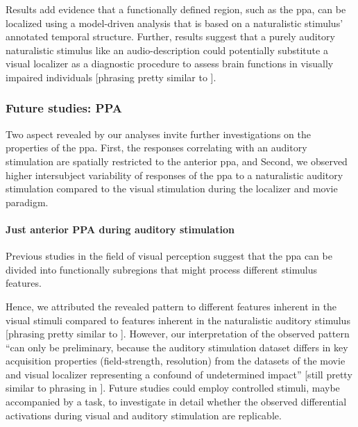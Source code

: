 
Results add evidence \citep[cf.][]{bartels2004mapping} that a functionally
defined region, such as the \ac{ppa}, can be localized using a model-driven
analysis that is based on a naturalistic stimulus' annotated temporal structure.
Further, results suggest that a purely auditory naturalistic stimulus like an
audio-description could potentially substitute a visual localizer as a
diagnostic procedure to assess brain functions in visually impaired individuals
[phrasing pretty similar to \citep{haeusler2022processing}].


\subsubsection{Future studies: PPA}

%
Two aspect revealed by our analyses invite further investigations on the
properties of the \ac{ppa}.
%
First, the responses correlating with an auditory stimulation are spatially
restricted to the anterior \ac{ppa}, and
%
Second, we observed higher intersubject variability of responses of the \ac{ppa}
to a naturalistic auditory stimulation compared to the visual stimulation during
the localizer and movie paradigm.


\paragraph{Just anterior PPA during auditory stimulation}

Previous studies in the field of visual perception suggest that the \ac{ppa} can
be divided into functionally subregions that might process different stimulus
features.


%
Hence, we attributed the revealed pattern to different features inherent in the
visual stimuli compared to features inherent in the naturalistic auditory
stimulus [phrasing pretty similar to \citep{haeusler2022processing}].
%
However, our interpretation of the observed pattern ``can only be preliminary,
because the auditory stimulation dataset differs in key acquisition properties
(field-strength, resolution) from the datasets of the movie and visual localizer
representing a confound of undetermined impact'' [still pretty similar to
phrasing in \citep{haeusler2022processing}].
Future studies could employ controlled stimuli, maybe accompanied by a task, to
investigate in detail whether the observed differential activations during
visual and auditory stimulation are replicable.


